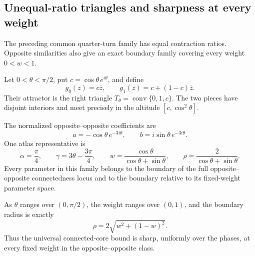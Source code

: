 \subsection{Unequal-ratio triangles and sharpness at every weight}
\label{sec:restored-OO-triangles}

The preceding common quarter-turn family has equal contraction
ratios. Opposite similarities also give an exact boundary family
covering every weight $0<w<1$.

\begin{theorem}
\label{thm:restored-OO-triangles}
Let $0<\theta<\pi/2$, put $c=\cos\theta\,e^{i\theta}$, and define
\[
 g_0(z)=c\overline z,\qquad
 g_1(z)=c+(1-c)\overline z.
\]
Their attractor is the right triangle
$T_\theta=\operatorname{conv}\{0,1,c\}$. The two pieces have disjoint
interiors and meet precisely in the altitude
$[c,\cos^2\theta]$.

The normalized opposite--opposite coefficients are
\begin{equation}\label{eq:restored-triangle-coefficients}
 a=-\cos\theta\,e^{-3i\theta},\qquad
 b=i\sin\theta\,e^{-3i\theta}.
\end{equation}
One atlas representative is
\begin{equation}\label{eq:restored-triangle-atlas}
 \alpha=\frac\pi4,\qquad
 \gamma=3\theta-\frac{3\pi}4,\qquad
 w=\frac{\cos\theta}{\cos\theta+\sin\theta},\qquad
 \rho=\frac2{\cos\theta+\sin\theta}.
\end{equation}
Every parameter in this family belongs to the boundary of the
full opposite--opposite connectedness locus and to the boundary
relative to its fixed-weight parameter space.

As $\theta$ ranges over $(0,\pi/2)$, the weight ranges over $(0,1)$,
and the boundary radius is exactly
\[
 \rho=2\sqrt{w^2+(1-w)^2}.
\]
Thus the universal connected-core bound is sharp, uniformly over
the phases, at every fixed weight in the opposite--opposite class.
\end{theorem}


